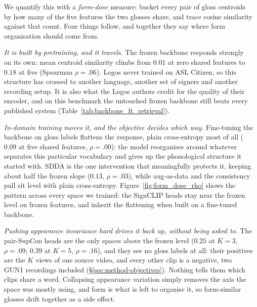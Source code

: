 We quantify this with a \emph{form-dose} measure: bucket every pair of
gloss centroids by how many of the five features the two glosses share,
and trace cosine similarity against that count. Four things follow, and
together they say where form organisation should come from.

\emph{It is built by pretraining, and it travels.} The frozen backbone
responds strongly on its own: mean centroid similarity climbs from
$0.01$ at zero shared features to $0.18$ at five (Spearman $\rho=.06$).
Logos never trained on ASL Citizen, so this structure has crossed to
another language, another set of signers and another recording setup. It
is also what the Logos authors credit for the quality of their encoder,
and on this benchmark the untouched frozen backbone still beats every
published system (Table~\ref{tab:backbone_ft_retrieval}).

\emph{In-domain training moves it, and the objective decides which way.}
Fine-tuning the backbone on gloss labels flattens the response, plain
cross-entropy most of all ($0.09$ at five shared features, $\rho=.00$):
the model reorganises around whatever separates this particular
vocabulary and gives up the phonological structure it started with. SDDA
is the one intervention that meaningfully protects it, keeping about half
the frozen slope ($0.13$, $\rho=.03$), while aug-as-data and the
consistency pull sit level with plain cross-entropy.
Figure~\ref{fig:form_dose_rho} shows the pattern across every space we
trained: the SignCLIP heads stay near the frozen level on frozen
features, and inherit the flattening when built on a fine-tuned backbone.

\emph{Pushing appearance invariance hard drives it back up, without
being asked to.} The pair-SupCon heads are the only spaces above the
frozen level ($0.25$ at $K{=}3$, $\rho=.09$; $0.39$ at $K{=}5$,
$\rho=.16$), and they see no gloss labels at all: their positives are the
$K$ views of one source video, and every other clip is a negative, two
GUN1 recordings included (\S\ref{sec:method-objectives}). Nothing tells
them which clips share a word. Collapsing appearance variation simply
removes the axis the space was mostly using, and form is what is left to
organise it, so form-similar glosses drift together as a side effect.

